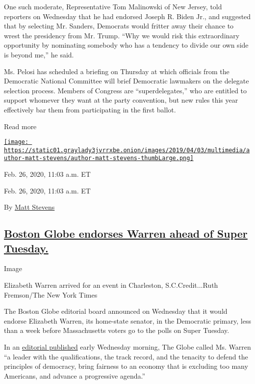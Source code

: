 One such moderate, Representative Tom Malinowski of New Jersey, told
reporters on Wednesday that he had endorsed Joseph R. Biden Jr., and
suggested that by selecting Mr. Sanders, Democrats would fritter away
their chance to wrest the presidency from Mr. Trump. ``Why we would risk
this extraordinary opportunity by nominating somebody who has a tendency
to divide our own side is beyond me,'' he said.

Ms. Pelosi has scheduled a briefing on Thursday at which officials from
the Democratic National Committee will brief Democratic lawmakers on the
delegate selection process. Members of Congress are ``superdelegates,''
who are entitled to support whomever they want at the party convention,
but new rules this year effectively bar them from participating in the
first ballot.

Read more

\href{https://www.nytimes3xbfgragh.onion/by/matt-stevens}{\texttt{[image: https://static01.graylady3jvrrxbe.onion/images/2019/04/03/multimedia/author-matt-stevens/author-matt-stevens-thumbLarge.png]}}

Feb. 26, 2020, 11:03 a.m. ET

Feb. 26, 2020, 11:03 a.m. ET

By \href{https://www.nytimes3xbfgragh.onion/by/matt-stevens}{Matt
Stevens}

\hypertarget{boston-globe-endorses-warren-ahead-of-super-tuesday}{%
\subsection{\texorpdfstring{\protect\hyperlink{boston-globe-endorses-warren-ahead-of-super-tuesday}{Boston
Globe endorses Warren ahead of Super
Tuesday.}}{Boston Globe endorses Warren ahead of Super Tuesday.}}\label{boston-globe-endorses-warren-ahead-of-super-tuesday}}

Image

Elizabeth Warren arrived for an event in Charleston, S.C.Credit...Ruth
Fremson/The New York Times

The Boston Globe editorial board announced on Wednesday that it would
endorse Elizabeth Warren, its home-state senator, in the Democratic
primary, less than a week before Massachusetts voters go to the polls on
Super Tuesday.

In an
\href{https://www.bostonglobe.com/2020/02/26/opinion/globe-endorses-elizabeth-warren/}{editorial
published} early Wednesday morning, The Globe called Ms. Warren ``a
leader with the qualifications, the track record, and the tenacity to
defend the principles of democracy, bring fairness to an economy that is
excluding too many Americans, and advance a progressive agenda.''

